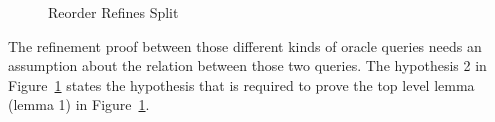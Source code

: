 \begin{figure}
%
\caption{Reorder Refines Split}
\label{fig:chapter:conlink:reorder-refines-split}
\end{figure}
The refinement proof between those different kinds of oracle queries needs an assumption about the relation between those two queries. 
The hypothesis 2 in Figure~\ref{fig:chapter:conlink:reorder-refines-split} 
states the hypothesis that is 
required to prove the top level lemma (lemma 1) in Figure~\ref{fig:chapter:conlink:reorder-refines-split}.

